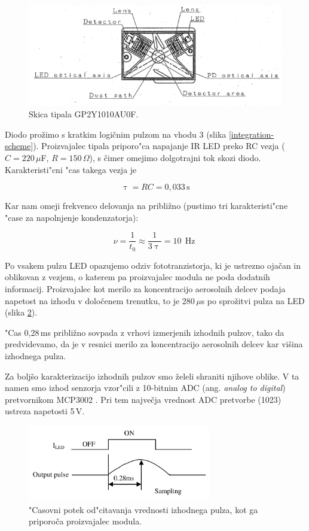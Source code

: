 \documentclass[12pt,a4paper]{article}
\DeclareMathOperator{\Hz}{Hz}
\begin{document}
\begin{figure}[H]
	\begin{center}
		\includegraphics[width=12cm]{sensor-scheme.png}
		\caption{Skica tipala GP2Y1010AU0F.}
		\label{sensor-scheme}
	\end{center}
\end{figure}

Diodo prožimo s kratkim logičnim pulzom na vhodu 3 (slika \ref{integration-scheme}). 
Proizvajalec tipala priporo"ca \cite{sharp-gp2y1010au0f} napajanje IR LED preko RC vezja ($C=220\,\mu$F, $R=150\,\Omega$), s čimer omejimo dolgotrajni tok skozi diodo.  
Karakteristi"cni "cas takega vezja je

$$
\uptau = RC = 0,033\,\mathrm{s}
$$

Kar nam omeji frekvenco delovanja na približno (pustimo tri karakteristi"cne "case za napolnjenje kondenzatorja):

$$
\nu = \frac{1}{t_0} \approx \frac{1}{3 \uptau} = 10\,\Hz
$$

Po vsakem pulzu LED opazujemo odziv fototranzistorja, ki je ustrezno ojačan in oblikovan z vezjem, o katerem pa proizvajalec modula ne poda dodatnih informacij. Proizvajalec kot merilo za koncentracijo aerosolnih delcev podaja napetost na izhodu v določenem trenutku, to je 280\,$\mu$s po sprožitvi pulza na LED (slika \ref{sampling-graph}).

 "Cas 0,28\,ms približno sovpada z vrhovi izmerjenih izhodnih pulzov, tako da predvidevamo, da je v resnici merilo za koncentracijo aerosolnih delcev kar višina izhodnega pulza.
 
 Za boljšo karakterizacijo izhodnih pulzov smo želeli shraniti njihove oblike. V ta namen smo izhod senzorja vzor"cili z 10-bitnim ADC (ang. \textit{analog to digital}) pretvornikom MCP3002 \cite{mcp3002}. Pri tem največja vrednost ADC pretvorbe (1023) ustreza napetosti 5\,V.

\begin{figure}[H]
	\begin{center}
		\includegraphics[width=8cm]{sampling_graph.png}
		\caption{"Casovni  potek od"citavanja vrednosti izhodnega pulza, kot ga priporoča proizvajalec modula.}
		\label{sampling-graph}
	\end{center}
\end{figure}
\end{document}
